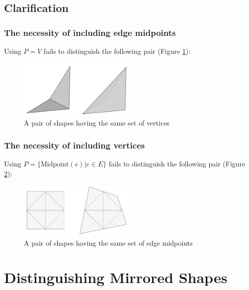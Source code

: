\documentclass{article}
\begin{document}
\FloatBarrier

\subsection{Clarification} \label{Clarification}

\subsubsection{The necessity of including edge midpoints}

Using $P = V$ fails to distinguish the following pair (Figure \ref{idcexample1}):

\begin{figure}[hbt!]
	\centering
	\includegraphics[width=0.5\textwidth]{Figures/IdentifierCounterExample1.png}
	\caption{
        A pair of shapes having the same set of vertices
    }
	\label{idcexample1}
\end{figure}

\subsubsection{The necessity of including vertices}

Using $P = \{\text{Midpoint}(e) | e \in E \}$ fails to distinguish the following pair (Figure \ref{idcexample2}):

\begin{figure}[hbt!]
	\centering
	\includegraphics[width=0.5\textwidth]{Figures/IdentifierCounterExample2.png}
	\caption{
        A pair of shapes having the same set of edge midpoints
    }
	\label{idcexample2}
\end{figure}

\section{Distinguishing Mirrored Shapes} \label{IdentifyMirror}
\end{document}

